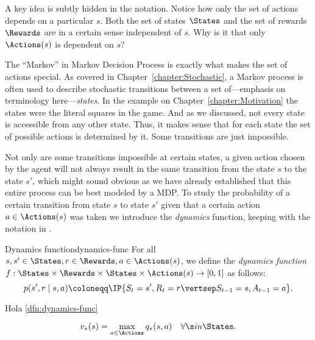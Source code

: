 A key idea is subtly hidden in the notation. Notice how only 
the set of actions depends on a particular $s$. Both the set of 
states $\States$ and the set of rewards $\Rewards$ are in a 
certain sense independent of $s$. Why is it that only 
$\Actions(s)$ is dependent on $s$?

The ``Markov'' in Markov Decision Process is exactly what makes 
the set of actions special. As covered in 
Chapter~\ref{chapter:Stochastic}, a Markov process is often 
used to describe stochastic transitions between a set 
of---emphasis on terminology here---\textit{states}. In the 
example on Chapter~\ref{chapter:Motivation} the states were the 
literal squares in the game. And as we discussed, not every 
state is accessible from any other state. Thus, it makes sense 
that for each state the set of possible actions is determined 
by it. Some transitions are just impossible.

Not only are some transitions impossible at certain states, a 
given action chosen by the agent will not always result in the 
same transition from the state $s$ to the state $s'$, which 
might sound obvious as we have already established that this 
entire process can be best modeled by a MDP. To study the 
probability of a certain transition from state $s$ to state 
$s'$ given that a certain action $a \in \Actions(s)$ was taken 
we introduce the \textit{dynamics} function, keeping with the 
notation in \cite{SuttonBarto}.

\begin{dfn}{Dynamics function}{dynamics-func}
	For all $s, s' \in \States, r \in \Rewards, a \in 
	\Actions(s)$, we define the \emph{dynamics function} $f: 
	\States \times \Rewards \times \States \times \Actions(s) 
	\to [0, 1]$ as follows:
	\begin{equation*}
		p(s', r \mid s, a) \coloneqq \IP{S_t = s', R_t = r 
		\vertsep S_{t-1} = s, A_{t-1} = a}.
	\end{equation*}
\end{dfn}

Hola \ref{dfn:dynamics-func}


\begin{equation}
	\label{eq:prop-dependencia-vq}
	v_* (s) = \max_{a \in \Actions} q_* (s, a) \quad \forall \s in \States.
\end{equation}